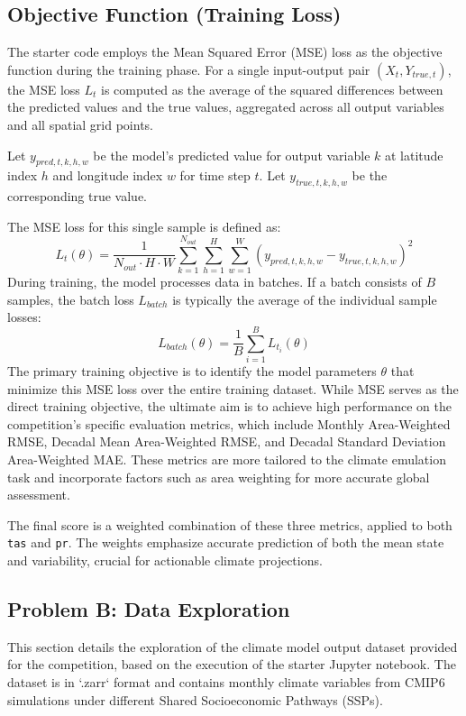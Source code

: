 \documentclass{article}
\begin{document}
\subsection{Objective Function (Training Loss)}

The starter code employs the Mean Squared Error (MSE) loss as the objective function during the training phase. For a single input-output pair \((X_t, Y_{true,t})\), the MSE loss \(L_t\) is computed as the average of the squared differences between the predicted values and the true values, aggregated across all output variables and all spatial grid points.

Let \( y_{pred,t,k,h,w} \) be the model's predicted value for output variable \(k\) at latitude index \(h\) and longitude index \(w\) for time step \(t\).
Let \( y_{true,t,k,h,w} \) be the corresponding true value.

The MSE loss for this single sample is defined as:
\[ L_t(\theta) = \frac{1}{N_{out} \cdot H \cdot W} \sum_{k=1}^{N_{out}} \sum_{h=1}^{H} \sum_{w=1}^{W} (y_{pred,t,k,h,w} - y_{true,t,k,h,w})^2 \]
During training, the model processes data in batches. If a batch consists of \(B\) samples, the batch loss \( L_{batch} \) is typically the average of the individual sample losses:
\[ L_{batch}(\theta) = \frac{1}{B} \sum_{i=1}^{B} L_{t_i}(\theta) \]
The primary training objective is to identify the model parameters \(\theta\) that minimize this MSE loss over the entire training dataset. While MSE serves as the direct training objective, the ultimate aim is to achieve high performance on the competition's specific evaluation metrics, which include Monthly Area-Weighted RMSE, Decadal Mean Area-Weighted RMSE, and Decadal Standard Deviation Area-Weighted MAE. These metrics are more tailored to the climate emulation task and incorporate factors such as area weighting for more accurate global assessment.

The final score is a weighted combination of these three metrics, applied to both \texttt{tas} and \texttt{pr}. The weights emphasize accurate prediction of both the mean state and variability, crucial for actionable climate projections.

\subsection{Problem B: Data Exploration}

This section details the exploration of the climate model output dataset provided for the competition, based on the execution of the starter Jupyter notebook. The dataset is in `.zarr` format and contains monthly climate variables from CMIP6 simulations under different Shared Socioeconomic Pathways (SSPs).
\end{document}

